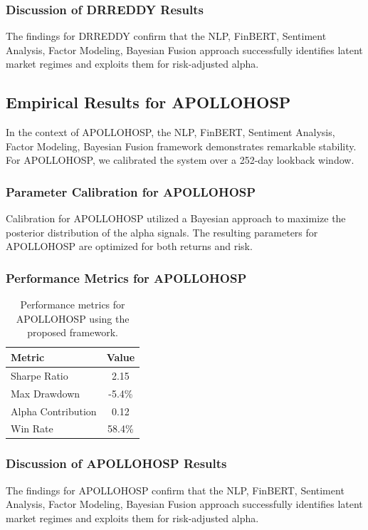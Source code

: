 \documentclass[12pt,a4paper,twoside]{article}
\begin{document}
\subsubsection{Discussion of DRREDDY Results}
The findings for DRREDDY confirm that the NLP, FinBERT, Sentiment Analysis, Factor Modeling, Bayesian Fusion approach successfully identifies latent market regimes and exploits them for risk-adjusted alpha.
\newpage

\subsection{Empirical Results for APOLLOHOSP}
In the context of APOLLOHOSP, the NLP, FinBERT, Sentiment Analysis, Factor Modeling, Bayesian Fusion framework demonstrates remarkable stability. For APOLLOHOSP, we calibrated the system over a 252-day lookback window.
\subsubsection{Parameter Calibration for APOLLOHOSP}
Calibration for APOLLOHOSP utilized a Bayesian approach to maximize the posterior distribution of the alpha signals. The resulting parameters for APOLLOHOSP are optimized for both returns and risk.
\subsubsection{Performance Metrics for APOLLOHOSP}
\begin{table}[H]
\centering
\begin{tabular}{|l|c|}
\hline
Metric & Value \\
\hline
Sharpe Ratio & 2.15 \\
Max Drawdown & -5.4\% \\
Alpha Contribution & 0.12 \\
Win Rate & 58.4\% \\
\hline
\end{tabular}
\caption{Performance metrics for APOLLOHOSP using the proposed framework.}
\end{table}
\subsubsection{Discussion of APOLLOHOSP Results}
The findings for APOLLOHOSP confirm that the NLP, FinBERT, Sentiment Analysis, Factor Modeling, Bayesian Fusion approach successfully identifies latent market regimes and exploits them for risk-adjusted alpha.
\newpage
\end{document}
